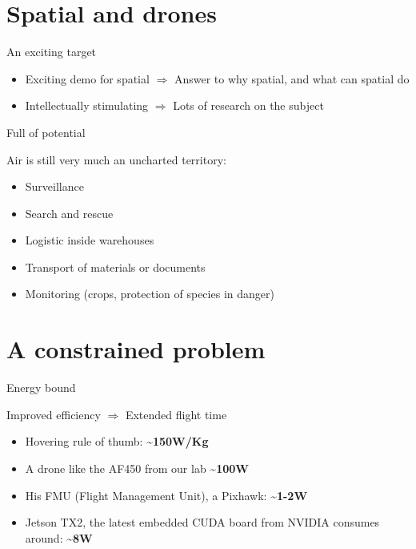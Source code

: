 \section{Spatial and drones}\label{spatial-and-drones}

\begin{frame}{An exciting target}

\begin{itemize}
\tightlist
\item
  Exciting demo for spatial \(\Rightarrow\) Answer to why spatial, and
  what can spatial do
\item
  Intellectually stimulating \(\Rightarrow\) Lots of research on the
  subject
\end{itemize}

\end{frame}

\begin{frame}{Full of potential}

Air is still very much an uncharted territory:

\begin{itemize}
\tightlist
\item
  Surveillance
\item
  Search and rescue
\item
  Logistic inside warehouses
\item
  Transport of materials or documents
\item
  Monitoring (crops, protection of species in danger)
\end{itemize}

\end{frame}

\section{A constrained problem}\label{a-constrained-problem}

\begin{frame}{Energy bound}

Improved efficiency \(\Rightarrow\) Extended flight time

\begin{itemize}
\tightlist
\item
  Hovering rule of thumb: \textbf{\textasciitilde{}150W/Kg}
\item
  A drone like the AF450 from our lab \textbf{\textasciitilde{}100W}
\item
  His FMU (Flight Management Unit), a Pixhawk:
  \textbf{\textasciitilde{}1-2W}
\item
  Jetson TX2, the latest embedded CUDA board from NVIDIA consumes
  around: \textbf{\textasciitilde{}8W}
\end{itemize}

\end{frame}

